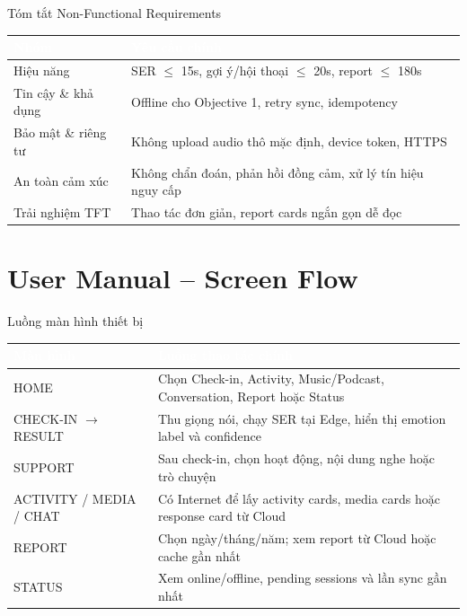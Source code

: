 \documentclass[12pt,aspectratio=169]{beamer}
\renewcommand{\arraystretch}{1.25}
\begin{document}
\begin{frame}{Tóm tắt Non-Functional Requirements}
  \small
  \begin{tabularx}{\textwidth}{L{3.5cm}Y}
  \toprule
  \textcolor{white}{\textbf{Nhóm}} & \textcolor{white}{\textbf{Yêu cầu chính}} \\
  \midrule
  Hiệu năng & SER $\le$ 15s, gợi ý/hội thoại $\le$ 20s, report $\le$ 180s \\
  Tin cậy \& khả dụng & Offline cho Objective 1, retry sync, idempotency \\
  Bảo mật \& riêng tư & Không upload audio thô mặc định, device token, HTTPS \\
  An toàn cảm xúc & Không chẩn đoán, phản hồi đồng cảm, xử lý tín hiệu nguy cấp \\
  Trải nghiệm TFT & Thao tác đơn giản, report cards ngắn gọn dễ đọc \\
  \bottomrule
  \end{tabularx}
\end{frame}

\section{User Manual -- Screen Flow}

\begin{frame}{Luồng màn hình thiết bị}
  \scriptsize
  \renewcommand{\arraystretch}{1.05}
  \begin{tabularx}{\textwidth}{L{3.0cm}Y}
  \toprule
  \textcolor{white}{\textbf{Màn hình}} & \textcolor{white}{\textbf{Luồng thao tác chính}} \\
  \midrule
  HOME & Chọn Check-in, Activity, Music/Podcast, Conversation, Report hoặc Status \\
  CHECK-IN $\rightarrow$ RESULT & Thu giọng nói, chạy SER tại Edge, hiển thị emotion label và confidence \\
  SUPPORT & Sau check-in, chọn hoạt động, nội dung nghe hoặc trò chuyện \\
  ACTIVITY / MEDIA / CHAT & Có Internet để lấy activity cards, media cards hoặc response card từ Cloud \\
  REPORT & Chọn ngày/tháng/năm; xem report từ Cloud hoặc cache gần nhất \\
  STATUS & Xem online/offline, pending sessions và lần sync gần nhất \\
  \bottomrule
  \end{tabularx}
\end{frame}
\end{document}

